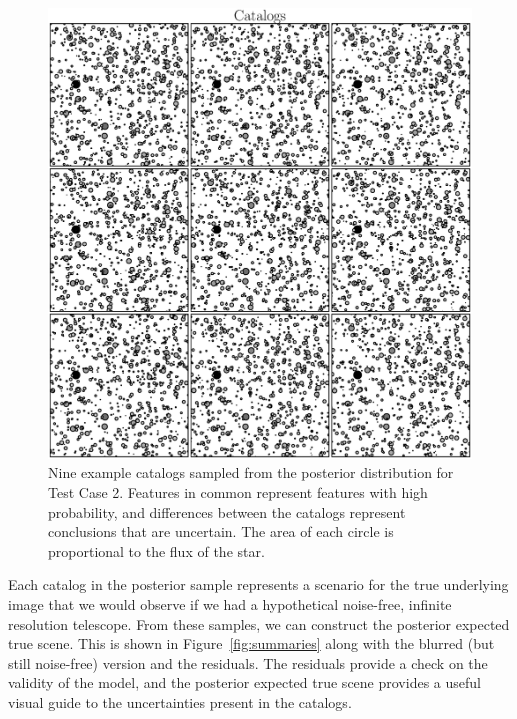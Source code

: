 \documentclass[manuscript]{aastex}
\begin{document}
\begin{figure}
\begin{center}
\includegraphics[scale=0.6]{Figures/catalogs.eps}
\end{center}
\caption{Nine example catalogs sampled from the posterior distribution for
Test Case 2. Features in common represent features with high probability,
and differences between the catalogs represent conclusions that are uncertain.
The area of each circle is proportional to the flux of the star.\label{fig:catalogs}}
\end{figure}

Each catalog in the posterior sample represents a scenario for the true
underlying image that we would observe if we had a hypothetical noise-free,
infinite resolution telescope. From these samples, we can construct the
posterior expected true scene. This is shown in Figure~\ref{fig:summaries} along
with the blurred (but still noise-free) version and the residuals. The residuals
provide a check on the validity of the model, and the posterior expected true
scene provides a useful visual guide to the uncertainties present in the catalogs.
\end{document}
